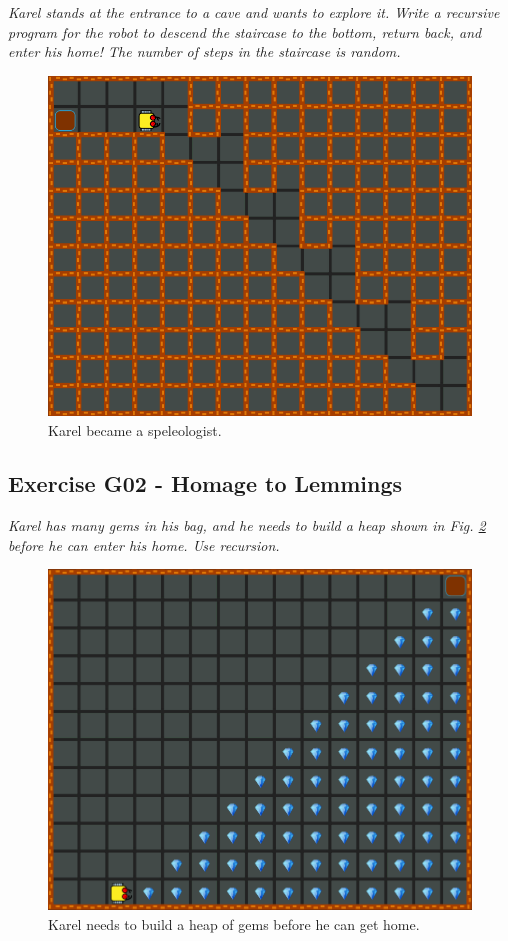 \documentclass[article,A4,12pt]{llncs}
\begin{document}
{{{{{\em Karel stands at the entrance to a cave and wants to explore it. Write a recursive program for the robot to descend the staircase to the bottom, return back, and enter his home! The number of steps in the staircase is random.   }
\newpage
\begin{figure}[!ht]
\begin{center}
\includegraphics[height=0.4\textwidth]{img/g01.png}
\end{center}
\vspace{-4mm}
\caption{Karel became a speleologist.}
\label{fig:g01}
\end{figure}
\noindent

\subsection{Exercise G02 - Homage to Lemmings}

{\em  Karel has many gems in his bag, and he needs to build a heap shown in Fig. \ref{fig:g02} before he can 
enter his home. Use recursion. }

\begin{figure}[!ht]
\begin{center}
\includegraphics[height=0.4\textwidth]{img/g02.png}
\end{center}
\vspace{-4mm}
\caption{Karel needs to build a heap of gems before he can get home.}
\label{fig:g02}
\end{figure}
\noindent

}}}}
\end{document}
